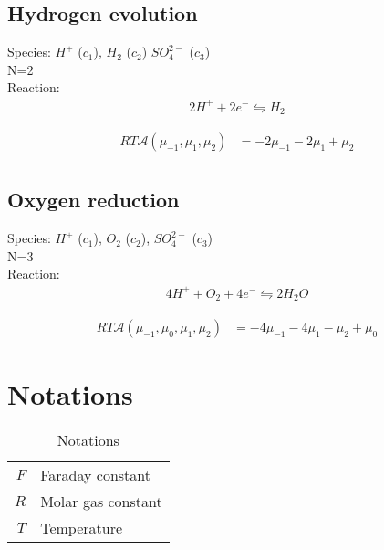 \documentclass[12pt,oneside,reqno]{amsart}
\numberwithin{equation}{section}
\begin{document}
\subsection{Hydrogen evolution}
Species: $H^+$ ($c_1$), $H_2$ ($c_2$) $SO_4^{2-}$ ($c_3$)\\
N=2\\
Reaction:
\begin{align}
  2H^+ + 2e^- \leftrightharpoons  H_2
\end{align}

\begin{align}
  RT\mathcal A(\mu_{-1}, \mu_1,\mu_2)&=-2\mu_{-1}-2\mu_1+\mu_2\\
\end{align}



\subsection{Oxygen reduction}
Species: $H^+$ ($c_1$),  $O_2$ ($c_2$), $SO_4^{2-}$ ($c_3$)\\
N=3\\
Reaction:
\begin{align}
  4H^+ + O_2 + 4e^- \leftrightharpoons  2H_2O
\end{align}

\begin{align}
  RT \mathcal A(\mu_{-1}, \mu_0,\mu_1,\mu_2)&=-4\mu_{-1}-4\mu_1-\mu_2+\mu_0
\end{align}



\clearpage




\appendix
\section{Notations}
\begin{table}
\begin{tabular}{rl}
  $F$ & Faraday constant\\
  $R$ & Molar gas constant\\
  $T$ & Temperature
\end{tabular}
  \caption{Notations}
  \label{tab:notations}
\end{table}
\end{document}
